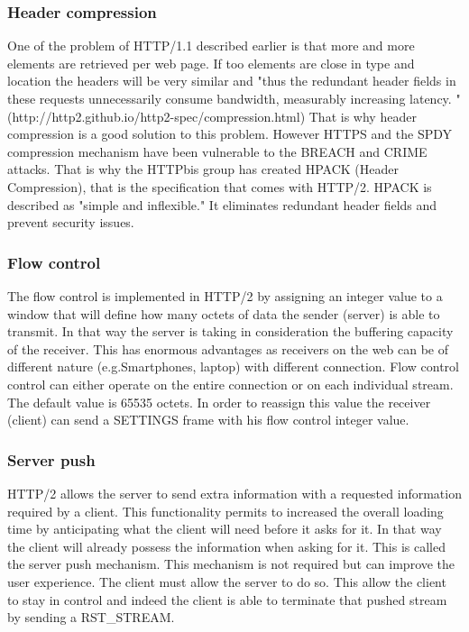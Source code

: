 \subsubsection{Header compression}
One of the problem of HTTP/1.1 described earlier is that more and more elements are retrieved per web page. If too elements are close in type and location the headers will be very similar and "thus the redundant header fields in these requests unnecessarily consume bandwidth, measurably increasing latency. " (http://http2.github.io/http2-spec/compression.html) That is why header compression is a good solution to this problem. However HTTPS and the SPDY compression mechanism have been vulnerable to the BREACH and CRIME attacks. That is why the HTTPbis group has created HPACK (Header Compression), that is the specification that comes with HTTP/2. HPACK is described as "simple and inflexible." It eliminates redundant header fields and prevent security issues.

\subsubsection{Flow control}
The flow control is implemented in HTTP/2 by assigning an integer value to a window that will define how many octets of data the sender (server) is able to transmit. In that way the server is taking in consideration the buffering capacity of the receiver. This has enormous advantages as receivers on the web can be of different nature (e.g.Smartphones, laptop) with different connection. Flow control control can either operate on the entire connection or on each individual stream. The default value is 65535 octets. In order to reassign this value the receiver (client) can send a SETTINGS frame with his flow control integer value.

\subsubsection{Server push}
HTTP/2 allows the server to send extra information with a requested information required by a client. This functionality permits to increased the overall loading time by anticipating what the client will need before it asks for it. In that way the client will already possess the information when asking for it. This is called the server push mechanism. This mechanism is not required but can improve the user experience. The client must allow the server to do so. This allow the client to stay in control and indeed the client is able to terminate that pushed stream by sending a RST\_STREAM.


